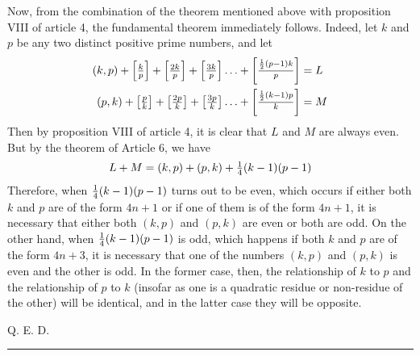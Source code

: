 \documentclass[twoside,12pt]{memoir}
\let\oldfrac\frac
\def\frac#1#2{\mathchoice{\tfrac{#1}{#2}}{\oldfrac{#1}{#2}}{\genfrac{}{}{}{2}{#1}{#2\mathstrut}}{\genfrac{}{}{}{3}{#1}{#2\mathstrut}}}
\begin{document}
Now, from the combination of the theorem mentioned above with proposition VIII of article 4, the fundamental theorem immediately follows. Indeed, let \(k\) and \(p\) be any two distinct positive prime numbers, and let
\[\begin{aligned}
(k, p)+\left[\frac{k}{p}\right]+\left[\frac{2 k}{p}\right]+\left[\frac{3 k}{p}\right] \ldots+\left[\frac{\frac{1}{2} (p-1) k}{p}\right] &=L\\
(p, k)+\left[\frac{p}{k}\right]+\left[\frac{2 p}{k}\right]+\left[\frac{3 p}{k}\right] \ldots+\left[\frac{\frac{1}{2} (k-1) p}{k}\right] &= M
\end{aligned}\]
Then by proposition VIII of article 4, it is clear that \(L\) and \(M\) are always even. But by the theorem of Article 6, we have
\[L+M=(k, p)+(p, k)+\frac{1}{4}(k-1)(p-1)\]
Therefore, when \(\frac{1}{4}(k-1)(p-1)\) turns out to be even, which occurs if either both \(k\) and \(p\) are of the form \(4n+1\) or if one of them is of the form \(4n+1\), it is necessary that either both \((k, p)\) and \((p, k)\) are even or both are odd. On the other hand, when \(\frac{1}{4}(k-1)(p-1)\) is odd, which happens if both \(k\) and \(p\) are of the form \(4n+3\), it is necessary that one of the numbers \((k, p)\) and \((p, k)\) is even and the other is odd. In the former case, then, the relationship of \(k\) to \(p\) and the relationship of \(p\) to \(k\) (insofar as one is a quadratic residue or non-residue of the other) will be identical, and in the latter case they will be opposite.

\qquad Q. E. D.
\begin{center}\rule{1.5in}{0.5pt}\end{center}
\end{document}
